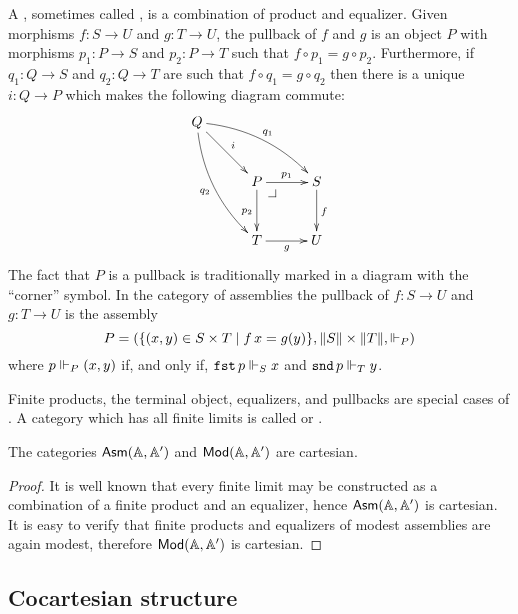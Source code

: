 A , sometimes called , is a
combination of product and equalizer. Given morphisms $f : S \to U$
and $g : T \to U$, the pullback of $f$ and $g$ is an object $P$ with
morphisms $p_1 : P \to S$ and $p_2 : P \to T$ such that $f \circ p_1 =
g \circ p_2$. Furthermore, if $q_1 : Q \to S$ and $q_2 : Q \to T$ are
such that $f \circ q_1 = g \circ q_2$ then there is a unique $i : Q
\to P$ which makes the following diagram commute:
%
\begin{equation*}
  \xymatrix@+0.5em{
    {Q}
    \ar[dr]^{i}
    \ar@/_1em/[ddr]_{q_2}
    \ar@/^1em/[rrd]^{q_1}
    &
    &
    \\
    &
    {P} \pbcorner
    \ar[r]^{p_1}
    \ar[d]_{p_2}
    &
    {S}
    \ar[d]^{f}
    \\
    &
    {T}
    \ar[r]_{g}
    &
    {U}
  }
\end{equation*}
%
The fact that $P$ is a pullback is traditionally marked in a diagram
with the ``corner'' symbol. In the category of assemblies the pullback
of $f : S \to U$ and $g : T \to U$ is the
assembly
%
\begin{equation*}
  P = (\set{(x,y) \in S \times T \such f\,x = g(y)}, \T{S} \times
  \T{T}, {\rz[P]})
\end{equation*}
%
where $p \rz[P] (x,y)$ if, and only if, $\combFst\,p
\rz[S] x$ and $\combSnd\,p \rz[T] y$.

Finite products, the terminal object, equalizers, and pullbacks are
special cases of . A category which has all finite
limits is called  or .

\begin{proposition}
  \label{prop:asm-cartesian}%
  The categories $\AsmA$ and $\Mod{\AA, \subAA}$ are cartesian.
\end{proposition}

\begin{proof}
  It is well known that every finite limit may be constructed as a
  combination of a finite product and an equalizer, hence $\AsmA$ is
  cartesian. It is easy to verify that finite products and equalizers
  of modest assemblies are again modest, therefore $\Mod{\AA,
    \subAA}$ is cartesian.
\end{proof}


\subsection{Cocartesian structure}
\label{sec:cocartesian-structure}


